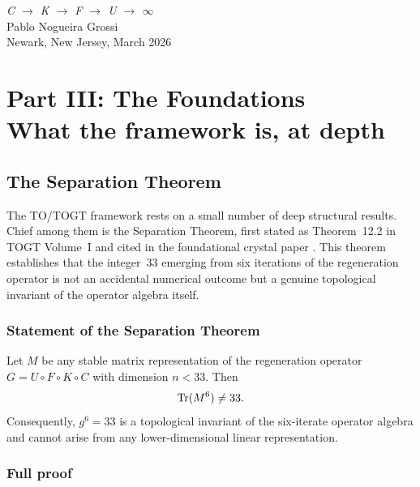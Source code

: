 \bigskip
\begin{flushright}
\textit{C \;$\to$\; K \;$\to$\; F \;$\to$\; U \;$\to$\; $\infty$}\\[0.3em]
Pablo Nogueira Grossi\\
Newark, New Jersey, March 2026
\end{flushright}

\part[Part III: The Foundations]{Part III: The Foundations\\[0.3em]
\large\normalfont What the framework is, at depth}

\chapter{The Separation Theorem}

The TO/TOGT framework rests on a small number of deep structural results. Chief among them is the Separation Theorem, first stated as Theorem~12.2 in TOGT Volume~I \citep{GrossiTOGT2025} and cited in the foundational crystal paper \citep{GrossiCrystal2026}. This theorem establishes that the integer~33 emerging from six iterations of the regeneration operator is not an accidental numerical outcome but a genuine topological invariant of the operator algebra itself.

\section{Statement of the Separation Theorem}

\begin{theorem}
Let $M$ be any stable matrix representation of the regeneration operator $G = U \circ F \circ K \circ C$ with dimension $n < 33$. Then
\[
\operatorname{Tr}(M^6) \neq 33.
\]
Consequently, $g^6 = 33$ is a topological invariant of the six-iterate operator algebra and cannot arise from any lower-dimensional linear representation.
\end{theorem}

\section{Full proof}

